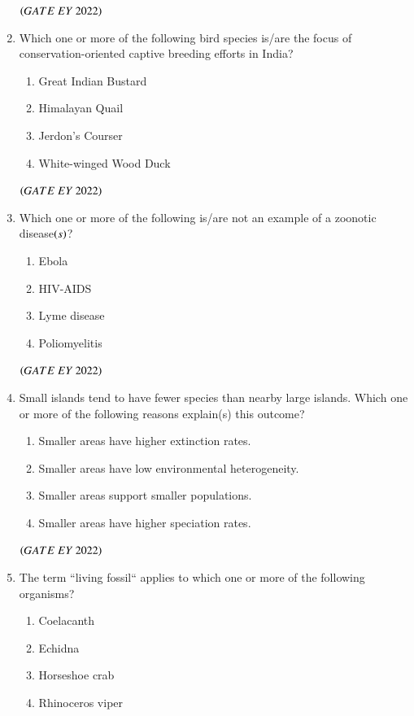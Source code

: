 \documentclass[journal]{IEEEtran}
\numberwithin{equation}{enumi}
\numberwithin{figure}{enumi}
\begin{document}
\begin{enumerate}
\begin{enumerate}
    \end{enumerate}
    \hfill{$\brak{ GATE\ EY\ 2022}$}
    \bigskip
 \item Which one or more of the following bird species is/are the focus of
conservation-oriented captive breeding efforts in India?
    \begin{enumerate}
        \item  Great Indian Bustard
        \item  Himalayan Quail
        \item  Jerdon's Courser
        \item  White-winged Wood Duck
    \end{enumerate}
    \hfill{$\brak{ GATE\ EY\ 2022}$}
    \bigskip
 \item Which one or more of the following is/are not an example of a zoonotic
disease$\left(s\right)$?
    \begin{enumerate}
        \item  Ebola
        \item  HIV-AIDS
        \item  Lyme disease
        \item  Poliomyelitis
    \end{enumerate}
    \hfill{$\brak{ GATE\ EY\ 2022}$}
    \bigskip
 \item   Small islands tend to have fewer species than nearby large islands. Which one or
more of the following reasons explain(s) this outcome?
    \begin{enumerate}
        \item  Smaller areas have higher extinction rates.
        \item  Smaller areas have low environmental heterogeneity.
        \item  Smaller areas support smaller populations.
        \item  Smaller areas have higher speciation rates.
    \end{enumerate}
    \hfill{$\brak{ GATE\ EY\ 2022}$}
    \bigskip
 \item The term ``living fossil`` applies to which one or more of the following organisms?
    \begin{enumerate}
        \item  Coelacanth
        \item  Echidna
        \item  Horseshoe crab
        \item  Rhinoceros viper
    \end{enumerate}

\end{enumerate}
\end{document}
